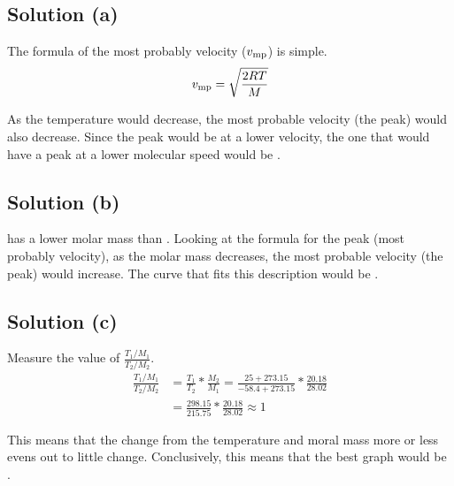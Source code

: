 \documentclass[10pt]{article}
\begin{document}
        \subsection{Solution (a)}
            The formula of the most probably velocity ($v_{\rm mp}$) is simple.
            \begin{equation}
                v_{\rm mp}  =   \sqrt{\frac{2RT}{M}}
            \end{equation}

            As the temperature would decrease, the most probable velocity (the peak) would also decrease.
            Since the peak would be at a lower velocity, the one that would have a peak at a lower molecular speed would be .

        \subsection{Solution (b)}
             has a lower molar mass than . 
            Looking at the formula for the peak (most probably velocity), as the molar mass decreases, the most probable velocity (the peak) would increase. 
            The curve that fits this description would be .

        \subsection{Solution (c)}
            Measure the value of $\frac{T_1 / M_1}{T_2 / M_2}$. 
            \begin{align}
                \frac{T_1 / M_1}{T_2 / M_2} &=  \frac{T_1}{T_2} * \frac{M_2}{M_1}
                    =   \frac{25 + 273.15}{-58.4 + 273.15} * \frac{20.18}{28.02}\\
                    &=  \frac{298.15}{215.75} * \frac{20.18}{28.02}
                    \approx 1
            \end{align}
            
            This means that the change from the temperature and moral mass more or less evens out to little change.
            Conclusively, this means that the best graph would be . 

    \pagebreak
\end{document}
